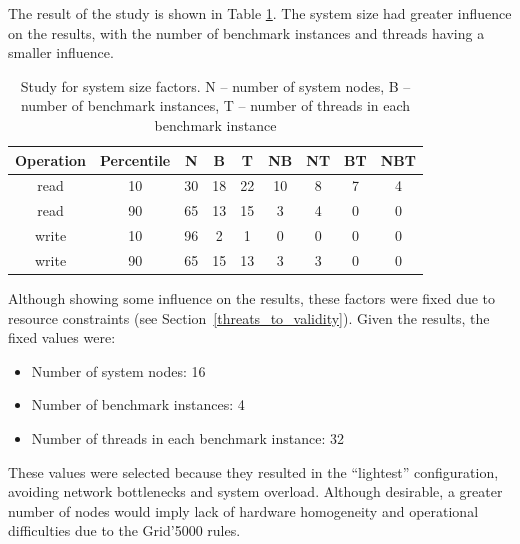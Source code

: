 \documentclass[doublespacing]{bmcart}
\begin{document}
The result of the study is shown in Table
\ref{tab:estudo_para_fatores_de_tamanho_do_sistema}. The system size had
greater influence on the results, with the number of benchmark instances and
threads having a smaller influence.

\begin{table}[h!]
\caption{Study for system size factors. N -- number of system nodes, B --
number of benchmark instances, T -- number of threads in each benchmark
instance} \begin{tabular}{ccccccccc} \hline

Operation & Percentile & N & B & T & NB & NT & BT & NBT\\\hline

read & 10 & 30 & 18 & 22 & 10 & 8 & 7 & 4 \\

read & 90 & 65 & 13 & 15 & 3 & 4 & 0 & 0 \\

write & 10 & 96 & 2 & 1 & 0 & 0 & 0 & 0 \\

write & 90 & 65 & 15 & 13 & 3 & 3 & 0 & 0 \\\hline

\end{tabular}
\label{tab:estudo_para_fatores_de_tamanho_do_sistema} \end{table}

Although showing some influence on the results, these factors were fixed due to
resource constraints (see Section~\ref{threats_to_validity}). Given the results, the fixed values
were:

\begin{itemize}

\item Number of system nodes: 16

\item Number of benchmark instances: 4

\item Number of threads in each benchmark instance: 32

\end{itemize}

These values were selected because they resulted in the ``lightest''
configuration, avoiding network bottlenecks and system overload. Although
desirable, a greater number of nodes would imply lack of hardware homogeneity
and operational difficulties due to the Grid'5000 rules.

\end{document}
